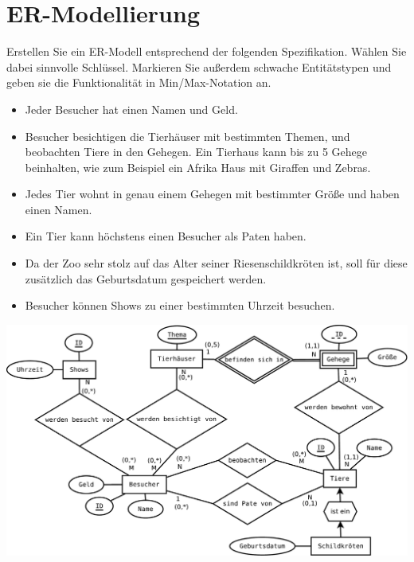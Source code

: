 
\newcommand{\equaltext}[1]{\ensuremath{\stackrel{\text{#1}}{=}}}
\usepackage{ marvosym }



\newcommand{\subtitle}{\textbf{\"Ubungsblatt 2}}





\section{ER-Modellierung}

Erstellen Sie ein ER-Modell entsprechend der folgenden Spezifikation. W\"ahlen Sie dabei sinnvolle Schl\"ussel. Markieren Sie au{\ss}erdem schwache Entit\"atstypen und geben sie die Funktionalit\"at in Min/Max-Notation an.

\begin{itemize}
\item Jeder Besucher hat einen Namen und Geld.
\item Besucher besichtigen die Tierh\"auser mit bestimmten Themen, und beobachten Tiere in den Gehegen. Ein Tierhaus kann bis zu 5 Gehege beinhalten, wie zum Beispiel ein Afrika Haus mit Giraffen und Zebras. 
\item Jedes Tier wohnt in genau einem Gehegen mit bestimmter Gr\"o{\ss}e und haben einen Namen.
\item Ein Tier kann h\"ochstens einen Besucher als Paten haben.
\item Da der Zoo sehr stolz auf das Alter seiner Riesenschildkr\"oten ist, soll f\"ur diese zus\"atzlich das Geburtsdatum gespeichert werden.
\item Besucher k\"onnen Shows zu einer bestimmten Uhrzeit besuchen.
\end{itemize}

\begin{solutionbox}
\newline
\includegraphics[width=\textwidth]{./a1_ml.pdf}
\end{solutionbox}


